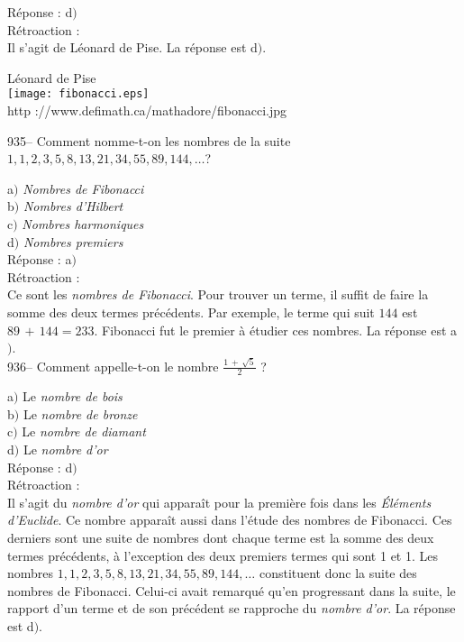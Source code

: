 ﻿\documentclass[letterpaper, 12pt]{article}
\begin{document}
R\'eponse : d$)$\\

R\'etroaction : \\
Il s'agit de L\'eonard de Pise. La r\'eponse est d$)$.

        \begin{center}
        L\'eonard de Pise\\
    \texttt{[image: fibonacci.eps]}\\
        {\footnotesize http ://www.defimath.ca/mathadore/fibonacci.jpg}
    \end{center}

935-- Comment nomme-t-on les nombres de la suite
$1,1,2,3,5,8,13,21,34,55,89,144, \ldots$?

a$)$ {\sl Nombres de Fibonacci} \\
b$)$ {\sl Nombres d'Hilbert} \\
c$)$ {\sl Nombres harmoniques} \\
d$)$ {\sl Nombres premiers}\\

R\'eponse : a$)$\\

R\'etroaction : \\
Ce sont les {\sl nombres de Fibonacci}. Pour trouver un terme, il
suffit de faire la somme des deux termes pr\'ec\'edents. Par
exemple, le terme qui suit $144$ est $89\,+\,144=233$. Fibonacci fut
le premier \`a
\'etudier ces nombres. La r\'eponse est a$)$.\\

936-- Comment appelle-t-on le nombre $\frac{1\,+\,\sqrt5}2$ ?

a$)$ Le {\sl nombre de bois} \\
b$)$ Le {\sl nombre de bronze} \\
c$)$ Le {\sl nombre de diamant} \\
d$)$ Le {\sl nombre d'or}\\

R\'eponse : d$)$\\

R\'etroaction : \\
Il s'agit du {\sl nombre d'or} qui appara\^it pour la premi\`ere
fois dans les {\sl \'El\'ements d'Euclide}. Ce nombre appara\^it
aussi dans l'\'etude des nombres de Fibonacci. Ces derniers sont une
suite de nombres dont chaque terme est la somme des deux termes
pr\'ec\'edents,  \`a l'exception des deux premiers termes qui sont 1
et 1. Les nombres $1,1,2,3,5,8,13,21,34,55,89,144, \ldots$
constituent donc la suite des nombres de Fibonacci. Celui-ci avait
remarqu\'e qu'en progressant dans la suite, le rapport d'un terme et
de son pr\'ec\'edent
se rapproche du {\sl nombre d'or}. La r\'eponse est d$)$.\\
\end{document}
